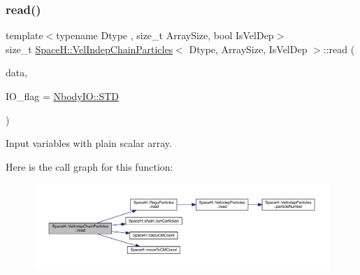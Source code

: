 \subsubsection{\texorpdfstring{read()}{read()}\hspace{0.1cm}{\footnotesize\ttfamily [2/2]}}
{\footnotesize\ttfamily template$<$typename Dtype , size\+\_\+t Array\+Size, bool Is\+Vel\+Dep$>$ \\
size\+\_\+t \mbox{\hyperlink{class_space_h_1_1_vel_indep_chain_particles}{Space\+H\+::\+Vel\+Indep\+Chain\+Particles}}$<$ Dtype, Array\+Size, Is\+Vel\+Dep $>$\+::read (\begin{DoxyParamCaption}\item[{const \mbox{\hyperlink{class_space_h_1_1_vel_indep_particles_abca40159a816385790d5a6fd19c1dc6d}{Scalar\+Buffer}} \&}]{data,  }\item[{const \mbox{\hyperlink{namespace_space_h_a296a8bae763a754564bfdce216e31b59}{Nbody\+IO}}}]{I\+O\+\_\+flag = {\ttfamily \mbox{\hyperlink{namespace_space_h_a296a8bae763a754564bfdce216e31b59ac6ce23be5d350ce18a665427d2d950f7}{Nbody\+I\+O\+::\+S\+TD}}} }\end{DoxyParamCaption})\hspace{0.3cm}{\ttfamily [inline]}}



Input variables with plain scalar array. 

Here is the call graph for this function\+:
\nopagebreak
\begin{figure}[H]
\begin{center}
\leavevmode
\includegraphics[width=350pt]{class_space_h_1_1_vel_indep_chain_particles_a60778581313c992696314625eb2b30cf_cgraph}
\end{center}
\end{figure}
\mbox{\label{class_space_h_1_1_vel_indep_chain_particles_a9a6b23671b53391cded80cde58b18608}} 
